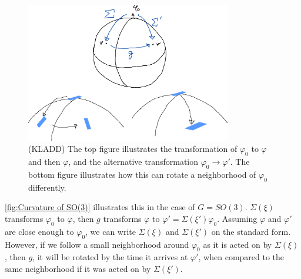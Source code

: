 \begin{figure}[h]
    \centering
    \includegraphics[width=0.8\textwidth]{figurer/parallel_transport_kladd.pdf}
    \caption{(KLADD) The top figure illustrates the transformation of $\varphi_0$ to $\varphi$ and then $\varphi$, and the alternative transformation $\varphi_0 \rightarrow \varphi'$. The bottom figure illustrates how this can rotate a neighborhood of $\varphi_0$ differently.}
    \label{fig:Curvature of SO(3)}
\end{figure}
\autoref{fig:Curvature of SO(3)} illustrates this in the case of $G = SO(3)$.
$\Sigma(\xi)$ transforms $\varphi_0$ to $\varphi$, then $g$ transforms $\varphi$ to $\varphi' = \Sigma(\xi') \varphi_0$.
Assuming $\varphi$ and $\varphi'$ are close enough to $\varphi_0$, we can write $\Sigma(\xi)$ and $\Sigma(\xi')$ on the standard form.
However, if we follow a small neighborhood around $\varphi_0$ as it is acted on by $\Sigma(\xi)$, then $g$, it will be rotated by the time it arrives at $\varphi'$, when compared to the same neighborhood if it was acted on by $\Sigma(\xi')$.

